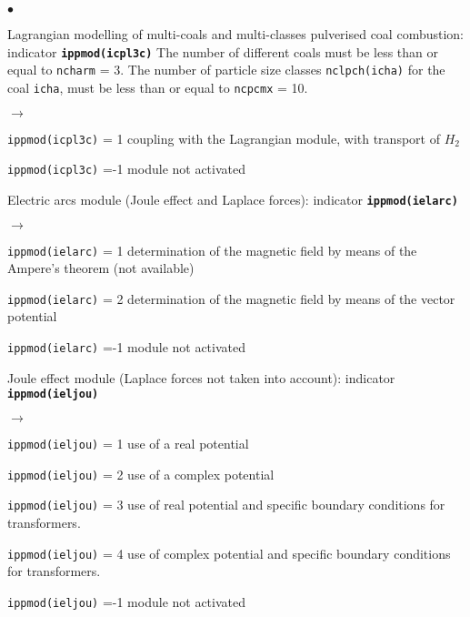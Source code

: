 {{{\begin{list}{$\bullet$}{}
        \item Lagrangian modelling of multi-coals and
             multi-classes pulverised coal combustion:
                 indicator {\bf \tt ippmod(icpl3c)}
              The number of different coals must be less than or equal to
              \texttt{ncharm} = 3. The number of particle size
             classes \texttt{nclpch(icha)} for the coal
             \texttt{icha}, must be less than or equal to
             \texttt{ncpcmx} = 10.
         \begin{list}{$\rightarrow$}{}
                \item \texttt{ippmod(icpl3c)} = 1 coupling with the Lagrangian
                      module, with transport of $H_2$
                \item \texttt{ippmod(icpl3c)} =-1 module not activated
         \end{list}
       \item Electric arcs module (Joule effect and Laplace forces):
             indicator {\bf \tt ippmod(ielarc)}
        \begin{list}{$\rightarrow$}{}
               \item \texttt{ippmod(ielarc)} = 1 determination of the magnetic field by
                     means of the Ampere's theorem (not available)
               \item \texttt{ippmod(ielarc)} = 2 determination of the magnetic
                     field by means of the vector potential
               \item \texttt{ippmod(ielarc)} =-1 module not activated
         \end{list}
       \item Joule effect module (Laplace forces not taken into account):
             indicator {\bf \tt ippmod(ieljou)}
        \begin{list}{$\rightarrow$}{}
               \item \texttt{ippmod(ieljou)} = 1 use of a real potential
               \item \texttt{ippmod(ieljou)} = 2 use of a complex potential
               \item \texttt{ippmod(ieljou)} = 3 use of real potential and specific boundary conditions for transformers.
               \item \texttt{ippmod(ieljou)} = 4 use of complex potential and specific boundary conditions for transformers.
               \item \texttt{ippmod(ieljou)} =-1 module not activated

\end{list}
\end{list}}}}
